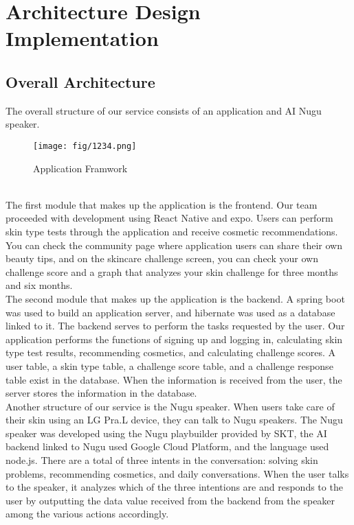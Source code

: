 \documentclass[conference]{IEEEtran}
\begin{document}
\section{Architecture Design Implementation}
\subsection{Overall Architecture}
The overall structure of our service consists of an application and AI Nugu speaker. \\ 
\begin{figure}[h]
    \centering
    \texttt{[image: fig/1234.png]}
    \label{fig:Application Framwork}
    \caption{Application Framwork} 
    \end{figure} \\ 
\indent The first module that makes up the application is the frontend. Our team proceeded with development using React Native and expo. Users can perform skin type tests through the application and receive cosmetic recommendations. You can check the community page where application users can share their own beauty tips, and on the skincare challenge screen, you can check your own challenge score and a graph that analyzes your skin challenge for three months and six months.\\

The second module that makes up the application is the backend. A spring boot was used to build an application server, and hibernate was used as a database linked to it. The backend serves to perform the tasks requested by the user. Our application performs the functions of signing up and logging in, calculating skin type test results, recommending cosmetics, and calculating challenge scores. A user table, a skin type table, a challenge score table, and a challenge response table exist in the database. When the information is received from the user, the server stores the information in the database.\\

Another structure of our service is the Nugu speaker. When users take care of their skin using an LG Pra.L device, they can talk to Nugu speakers. The Nugu speaker was developed using the Nugu playbuilder provided by SKT, the AI backend linked to Nugu used Google Cloud Platform, and the language used node.js. There are a total of three intents in the conversation: solving skin problems, recommending cosmetics, and daily conversations. When the user talks to the speaker, it analyzes which of the three intentions are and responds to the user by outputting the data value received from the backend from the speaker among the various actions accordingly.
\end{document}
